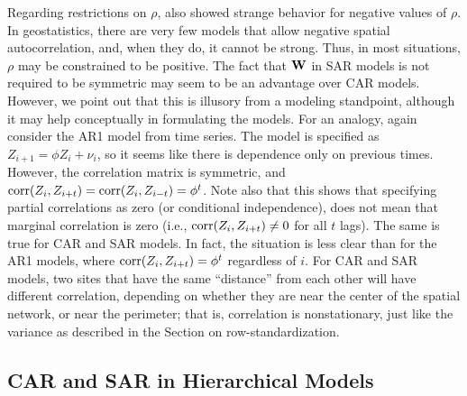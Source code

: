 \documentclass[11pt, titlepage]{article}\usepackage[]{graphicx}\usepackage[]{color}
\begin{document}
\begin{spacing}{1.9}
\begin{flushleft}
Regarding restrictions on $\rho$, \citet{Wall:clos:2004} also showed strange behavior for negative values of $\rho$. In geostatistics, there are very few models that allow negative spatial autocorrelation, and, when they do, it cannot be strong. Thus, in most situations, $\rho$ may be constrained to be positive. The fact that $\mathbf{W}$ in SAR models is not required to be symmetric may seem to be an advantage over CAR models.  However, we point out that this is illusory from a modeling standpoint, although it may help conceptually in formulating the models.  For an analogy, again consider the AR1 model from time series.  The model is specified as $Z_{i+1} = \phi Z_i + \nu_i$, so it seems like there is dependence only on previous times.  However, the correlation matrix is symmetric, and $\textrm{corr}(Z_i, Z_{i + t}) = \textrm{corr}(Z_i,Z_{i - t}) = \phi^t$.  Note also that this shows that specifying partial correlations as zero (or conditional independence), does not mean that marginal correlation is zero (i.e., $\textrm{corr}(Z_i, Z_{i + t}) \neq 0$ for all $t$ lags).  The same is true for CAR and SAR models.  In fact, the situation is less clear than for the AR1 models, where $\textrm{corr}(Z_i, Z_{i + t}) = \phi^t$ regardless of $i$.  For CAR and SAR models, two sites that have the same ``distance'' from each other will have different correlation, depending on whether they are near the center of the spatial network, or near the perimeter; that is, correlation is nonstationary, just like the variance as described in the Section on row-standardization.

\subsection*{CAR and SAR in Hierarchical Models}


\end{flushleft}
\end{spacing}
\end{document}
